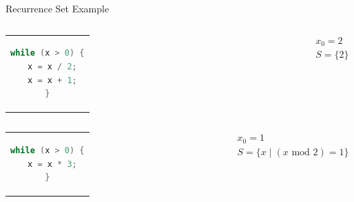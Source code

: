 \documentclass[xcolor=pdftex,t,11pt]{beamer}
\newcommand{\red}[1]{\textcolor{red}{#1}}
\newcommand{\blue}[1]{\textcolor{blue}{#1}}
\newcommand{\green}[1]{\textcolor{ta3chameleon}{#1}}
\begin{document}
\begin{frame}[fragile]{Recurrence Set Example}
\begin{center}
\begin{columns}[c]
  \begin{tabular}{c}
   \begin{lstlisting}[language=c,basicstyle=\normalsize]
while (x > 0) {
  x = x / 2;
  x = x + 1;
}
   \end{lstlisting}
  \end{tabular}
 \pause
 \begin{gather*}
  x_0 = 2 \\
  S = \{ 2 \}
 \end{gather*}
\end{columns}
\end{center}

\pause

\begin{center}
\begin{columns}[c]
  \begin{tabular}{c}
   \begin{lstlisting}[language=c,basicstyle=\normalsize]
while (x > 0) {
  x = x * 3;
}
   \end{lstlisting}
  \end{tabular}
 \pause
 \begin{gather*}
  x_0 = 1 \\
  S = \{ x \mid (x \text{ mod } 2) = 1 \}
 \end{gather*}
\end{columns}
\end{center}

\end{frame}
% 
% 
%  
%  
\end{document}
